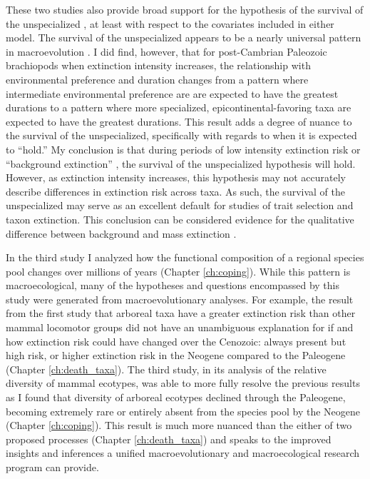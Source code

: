 These two studies also provide broad support for the hypothesis of the survival of the unspecialized \citep{Simpson1944}, at least with respect to the covariates included in either model. The survival of the unspecialized appears to be a nearly universal pattern in macroevolution \citep{Simpson1944,Liow2004a,Liow2007b,Nurnberg2013a,Nurnberg2015,Baumiller1993,Raia2016}. I did find, however, that for post-Cambrian Paleozoic brachiopods when extinction intensity increases, the relationship with environmental preference and duration changes from a pattern where intermediate environmental preference are are expected to have the greatest durations to a pattern where more specialized, epicontinental-favoring taxa are expected to have the greatest durations. This result adds a degree of nuance to the survival of the unspecialized, specifically with regards to when it is expected to ``hold.'' My conclusion is that during periods of low intensity extinction risk or ``background extinction'' \citep{Jablonski1986,Foote2007b}, the survival of the unspecialized hypothesis will hold. However, as extinction intensity increases, this hypothesis may not accurately describe differences in extinction risk across taxa. As such, the survival of the unspecialized may serve as an excellent default for studies of trait selection and taxon extinction. This conclusion can be considered evidence for the qualitative difference between background and mass extinction \citep{Jablonski1986}.

In the third study I analyzed how the functional composition of a regional species pool changes over millions of years (Chapter \ref{ch:coping}). While this pattern is macroecological, many of the hypotheses and questions encompassed by this study were generated from macroevolutionary analyses. For example, the result from the first study that arboreal taxa have a greater extinction risk than other mammal locomotor groups did not have an unambiguous explanation for if and how extinction risk could have changed over the Cenozoic: always present but high risk, or higher extinction risk in the Neogene compared to the Paleogene (Chapter \ref{ch:death_taxa}). The third study, in its analysis of the relative diversity of mammal ecotypes, was able to more fully resolve the previous results as I found that diversity of arboreal ecotypes declined through the Paleogene, becoming extremely rare or entirely absent from the species pool by the Neogene (Chapter \ref{ch:coping}). This result is much more nuanced than the either of two proposed processes (Chapter \ref{ch:death_taxa}) and speaks to the improved insights and inferences a unified macroevolutionary and macroecological research program can provide.

